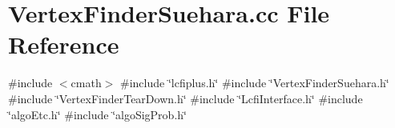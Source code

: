 \section{Vertex\+Finder\+Suehara.\+cc File Reference}
\label{VertexFinderSuehara_8cc}
{\ttfamily \#include $<$cmath$>$}\newline
{\ttfamily \#include \char`\"{}lcfiplus.\+h\char`\"{}}\newline
{\ttfamily \#include \char`\"{}Vertex\+Finder\+Suehara.\+h\char`\"{}}\newline
{\ttfamily \#include \char`\"{}Vertex\+Finder\+Tear\+Down.\+h\char`\"{}}\newline
{\ttfamily \#include \char`\"{}Lcfi\+Interface.\+h\char`\"{}}\newline
{\ttfamily \#include \char`\"{}algo\+Etc.\+h\char`\"{}}\newline
{\ttfamily \#include \char`\"{}algo\+Sig\+Prob.\+h\char`\"{}}\newline
